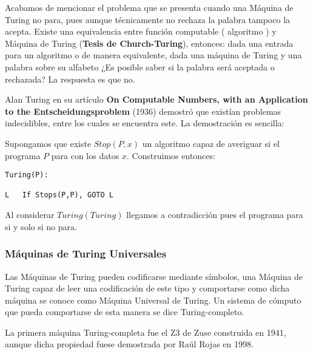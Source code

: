 Acabamos de mencionar el problema que se presenta cuando una Máquina de Turing no para, pues aunque técnicamente no rechaza la palabra tampoco la acepta. Existe una equivalencia entre función computable ( algoritmo ) y Máquina de Turing (\textbf{Tesis de Church-Turing}), entonces: dada una entrada para un algoritmo o de manera equivalente, dada una máquina de Turing y una palabra sobre su alfabeto ¿Es posible saber si la palabra será aceptada o rechazada? La respuesta es que no.

\vspace{10px}

Alan Turing en su artículo \textbf{On Computable Numbers, with an Application to the Entscheidungsproblem} (1936) demostró que existían problemas indecidibles, entre los cuales se encuentra este. La demostración es sencilla:

\vspace{10px}

Supongamos que existe $Stop(P,x)$ un algoritmo capaz de averiguar si el programa $P$ para con los datos $x$. Construimos entonces:

\begin{lstlisting}
Turing(P):

L	If Stops(P,P), GOTO L
\end{lstlisting}

\vspace{0.5cm}

Al considerar $Turing(Turing)$ llegamos a contradicción pues el programa para si y solo si no para.

\subsubsection{Máquinas de Turing Universales}

Las Máquinas de Turing pueden codificarse mediante símbolos, una Máquina de Turing capaz de leer una codificación de este tipo y comportarse como dicha máquina se conoce como Máquina Universal de Turing. Un sistema de cómputo que pueda comportarse de esta manera se dice Turing-completo.

\vspace{10px}

La primera máquina Turing-completa fue el Z3 de Zuse construida en 1941, aunque dicha propiedad fuese demostrada por Raúl Rojas en 1998.

\vspace{10px}

